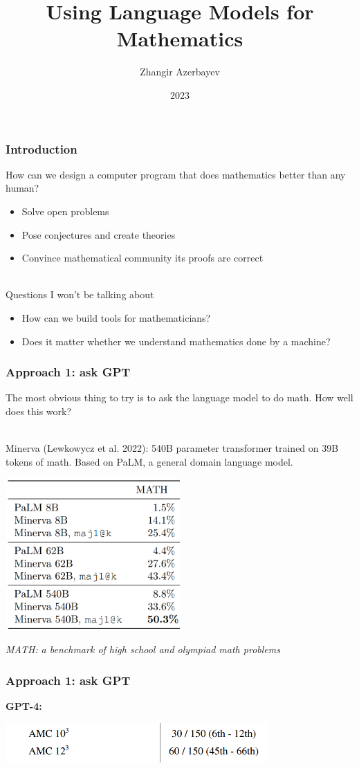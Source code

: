 \documentclass[handout]{beamer}
\title{Using Language Models for Mathematics}
\author{Zhangir Azerbayev}
\institute{Yale University}
\date{2023}
\begin{document}
\frame{\titlepage}

\begin{frame}
\frametitle{Introduction}
How can we design a computer program that does mathematics better than any human?
\begin{itemize}
    \item Solve open problems
    \item Pose conjectures and create theories
    \item Convince mathematical community its proofs are correct\\~\
\end{itemize}
\pause
Questions I won't be talking about
\begin{itemize}
    \item How can we build tools for mathematicians?
    \item Does it matter whether we understand mathematics done by a machine?
\end{itemize}
\end{frame}

\begin{frame}
\frametitle{Approach 1: ask GPT}
The most obvious thing to try is to ask the language model to do math. How well does this work?\\~\ \pause

Minerva (Lewkowycz et al. 2022): 540B parameter transformer trained on 39B tokens of math. Based on PaLM, a general domain language model.
\begin{center}
\includegraphics[width=0.5\textwidth]{img/minerva.png}
\end{center}
{\it MATH: a benchmark of high school and olympiad math problems}
\end{frame}

\begin{frame}
\frametitle{Approach 1: ask GPT}
{\bf GPT-4:}
\begin{center}
    \includegraphics[width=0.75\textwidth]{img/gpt4.png} 
\end{center}
\end{frame}
\end{document}
